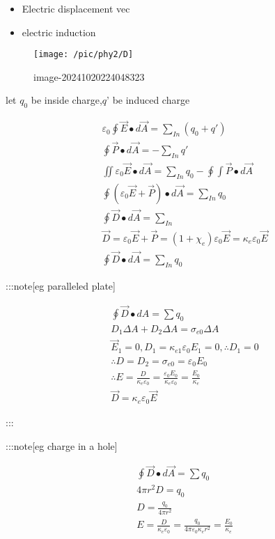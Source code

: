 \documentclass[
]{article}
\providecommand{\tightlist}{%
  \setlength{\itemsep}{0pt}\setlength{\parskip}{0pt}}
\begin{document}
\begin{itemize}
\tightlist
\item
  Electric displacement vec
\item
  electric induction
\end{itemize}

\begin{figure}
\centering
\texttt{[image: /pic/phy2/D]}
\caption{image-20241020224048323}
\end{figure}

let \(q_0\) be inside charge,\(q’\) be induced charge

\[
\begin{aligned}
&\varepsilon_0\oint\vec{E}\bullet d\vec{A}=\sum_{In}(q_0+q') \\
&\oint\vec{P}\bullet d\vec{A}=-\sum_{In}q' \\
&\iint\varepsilon_0\vec{E}\bullet d\vec{A}=\sum_{In}q_0-\oint\int\vec{P}\bullet d\vec{A} \\
&\oint(\varepsilon_0\vec{E}+\vec{P})\bullet d\vec{A}=\sum_{In}q_0 \\
&\oint\vec{D}\bullet d\vec{A}=\sum_{In}\\
&\vec D=\varepsilon _0\vec E+\vec P=(1+\chi_e)\varepsilon _0 \vec E=\kappa _e\varepsilon _0 \vec E\\
&\boxed{\oint\vec{D}\bullet d\vec{A}=\sum_{In}q_0}
\end{aligned}
\]

:::note{[}eg paralleled plate{]}

\[
\begin{aligned}
&\oint\vec{D}\bullet dA=\sum q_0 \\
&D_1\Delta A+D_2\Delta A=\sigma_{e0}\Delta A \\
&\vec{E}_1=0,D_1=\kappa_{e1}\varepsilon_0E_1=0,\therefore D_1=0 \\
&\therefore D=D_2=\sigma_{e0}=\varepsilon_0E_0 \\
&\therefore E=\frac D{\kappa_e\varepsilon_0}=\frac{\varepsilon_0E_0}{\kappa_e\varepsilon_0}=\frac{E_0}{\kappa_e}\\
&\vec D=\kappa _e\varepsilon _0\vec E
\end{aligned}
\]

:::

:::note{[}eg charge in a hole{]}

\[
\begin{aligned}
&\oint\vec{D}\bullet d\vec{A}=\sum q_0 \\
&4\pi r^2D=q_0 \\
&D=\frac{q_0}{4\pi r^2} \\
&E=\frac{D}{\kappa_e\varepsilon_0}=\frac{q_0}{4\pi\varepsilon_0\kappa_er^2}=\frac{E_0}{\kappa_e}
\end{aligned}
\]
\end{document}
